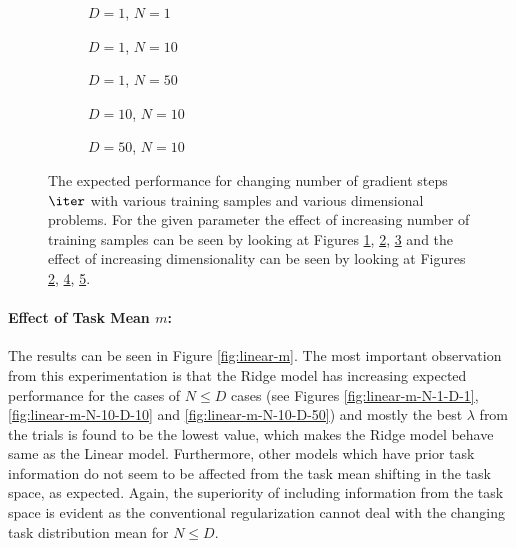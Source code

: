 \begin{figure}[h!]
  \centering
    \begin{subfigure}{0.3\textwidth}
      \centering
      \caption{$D=1$, $N=1$}
      \label{fig:linear-n_iter-N-1-D-1}
    \end{subfigure}
    \begin{subfigure}{0.3\textwidth}
      \centering
      \caption{$D=1$, $N=10$}
      \label{fig:linear-n_iter-N-10-D-1}
    \end{subfigure}
    \begin{subfigure}{0.3\textwidth}
      \centering
      \caption{$D=1$, $N=50$}
      \label{fig:linear-n_iter-N-50-D-1}
    \end{subfigure}

    \begin{subfigure}{0.3\textwidth}
      \centering
      \caption{$D=10$, $N=10$}
      \label{fig:linear-n_iter-N-10-D-10}
    \end{subfigure}
    \begin{subfigure}{0.3\textwidth}
      \centering
      \caption{$D=50$, $N=10$}
      \label{fig:linear-n_iter-N-10-D-50}
    \end{subfigure}  

  \caption{The expected performance for changing number of gradient steps $\iter$ with various training samples and various dimensional problems. For the given parameter the effect of increasing number of training samples can be seen by looking at Figures \ref{fig:linear-n_iter-N-1-D-1}, \ref{fig:linear-n_iter-N-10-D-1}, \ref{fig:linear-n_iter-N-50-D-1} and the effect of increasing dimensionality can be seen by looking at Figures \ref{fig:linear-n_iter-N-10-D-1}, \ref{fig:linear-n_iter-N-10-D-10}, \ref{fig:linear-n_iter-N-10-D-50}.}\label{fig:linear-n_iter}
\end{figure}


\paragraph{Effect of Task Mean $m$:} The results can be seen in Figure \ref{fig:linear-m}. The most important observation from this experimentation is that the Ridge model has increasing expected performance for the cases of $N\leq D$ cases (see Figures \ref{fig:linear-m-N-1-D-1}, \ref{fig:linear-m-N-10-D-10} and \ref{fig:linear-m-N-10-D-50}) and mostly the best $\lambda$ from the trials is found to be the lowest value, which makes the Ridge model behave same as the Linear model. Furthermore, other models which have prior task information do not seem to be affected from the task mean shifting in the task space, as expected. Again, the superiority of including information from the task space is evident as the conventional regularization cannot deal with the changing task distribution mean for $N\leq D$.

